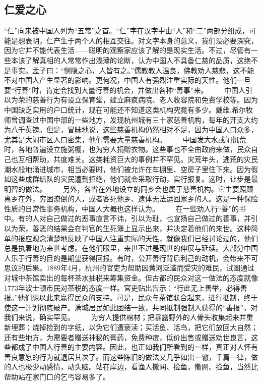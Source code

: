 \documentclass[12pt,oneside]{book}
\begin{document}
\begin{common-format}
\chapter{仁爱之心}
“仁”向来被中国人列为“五常”之首。“仁”字在汉字中由“人”和“二”两部分组成，可能是想表明，仁产生于两个人的相互交往。对文字本身的意义，我们没必要深究，因为它并不能代表生活——聪明的观察家应该了解的是现实生活。不过，尽管有一些本该了解真相的人常常作出浅薄的论断，认为中国人不具备仁慈的品质，这绝不是事实。孟子曰：“恻隐之心，人皆有之。”儒教教人温良，佛教劝人慈悲，这不能不对中国人产生显著的影响。更何况，中国人有强烈注重实际的天性。他们一旦要“行善”时，肯定会找到大量行善的机会，并做出各种“善事”来。 
　　中国人引以为荣的慈善行为有设立保育堂，建立麻疯病院、老人收容院和免费学校等。因为中国缺乏实用的户口统计，现在可能还不知道这类机构究竟有多少。戴维.希尔牧师曾调查过中国中部的一些地方，发现杭州城有三十家慈善机构，每年的开支大约为八千英镑。但是，冒昧地说，这些慈善机构仍然相对不足，因为中国人口众多，尤其是大闹市区人口密集，他们需要大量慈善机构。 
　　中国发大水或闹饥荒时，各地普遍设立施粥棚，也为穷人捐赠衣物。这些事也不全由政府来做，民众自己也互相帮助，共度难关。这类耗资巨大的事例并不罕见。灾荒年头，逃荒的灾民潮水般地涌进城市，相当必要时，他们被允许在车棚里、空房子里住下来。因为假如这些成群结队的灾民遭到拒绝，他们就会采取行动，实行报复。这时，让步是最明智的做法。 
　　另外，各省在外地设立的同乡会也属于慈善机构。它主要照顾离乡在外，穷困潦倒的人，或者客死他乡、遗体无法运回家乡的人。这是一种保险性质的日常性事务机构，中国人大概也这样认为。 
　　在一些劝人行“善”的书中。有的人对自己做过的恶事直言不讳，引以为耻，也宣扬自己做过的善事，并引以为荣，善恶的结果会在判官的生死簿上显示出来，并决定着他们的来世。这种简单的报应观念清楚地反映了中国人注重实际的天性，就像我们已经讨论过的，他们总是执着地为来世考虑。在他们眼里，来世不过是现世的伸展与延续。大部分中国人乐于行善的目的是期望获得回报。有时，公开善行背后利己的动机，会带来不可思议的后果。1889年4月，杭州的官吏为帮助因黄河泛滥而受灾的难民，试图通过对城中茶馆卖出的每杯茶水抽税来筹集资金。但古都的民众对这一做法的态度就像1773年波士顿市民对茶税的态度一样。官吏贴出告示：“行此无上善举，必得善报。”他们想以此来赢得民众的支持。可是，民众与茶馆联合起来，进行抵制，终于使这一计划彻底破产。满城居民如此团结一致，共同抵制强制人获得的“善报”，对我们来说，确实罕见。 
　　为穷人提供棺材；把暴露野外的人骨头收集起来并重新埋葬；烧掉捡到的字纸，以免它们遭亵渎；买活鱼、活鸟，把它们放回大自然；还有些地方，为需要者赠送神秘的膏药，免费种痘，低价出售或赠送劝世良言，这些都成了中国人行善的主要内容。因此，也正如我们所看到的一样，真正对人怀有善良意愿的行为就退居其次了。而这些陈旧的做法又几乎如出一辙，千篇一律，做的人也极少动感情，动头脑。站在岸边，看渔人撒网、捡鱼，撤网、捡鱼，当然比帮助站在家门口的乞丐容易多了。 

\end{common-format}
\end{document}
